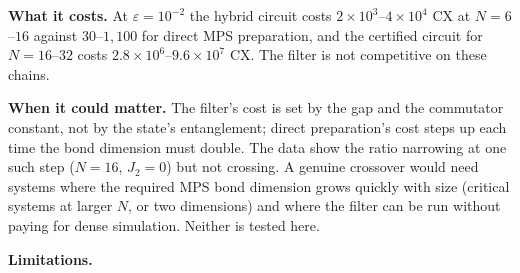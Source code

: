 \documentclass[
]{article}
\begin{document}
\textbf{What it costs.} At \(\varepsilon=10^{-2}\) the hybrid circuit
costs \(2\times10^{3}\)--\(4\times10^{4}\) CX at \(N=6\)--\(16\) against
\(30\)--\(1{,}100\) for direct MPS preparation, and the certified
circuit for \(N=16\)--\(32\) costs
\(2.8\times10^{6}\)--\(9.6\times10^{7}\) CX. The filter is not
competitive on these chains.

\textbf{When it could matter.} The filter's cost is set by the gap and
the commutator constant, not by the state's entanglement; direct
preparation's cost steps up each time the bond dimension must double.
The data show the ratio narrowing at one such step (\(N=16\), \(J_2=0\))
but not crossing. A genuine crossover would need systems where the
required MPS bond dimension grows quickly with size (critical systems at
larger \(N\), or two dimensions) and where the filter can be run without
paying for dense simulation. Neither is tested here.

\textbf{Limitations.}
\end{document}

